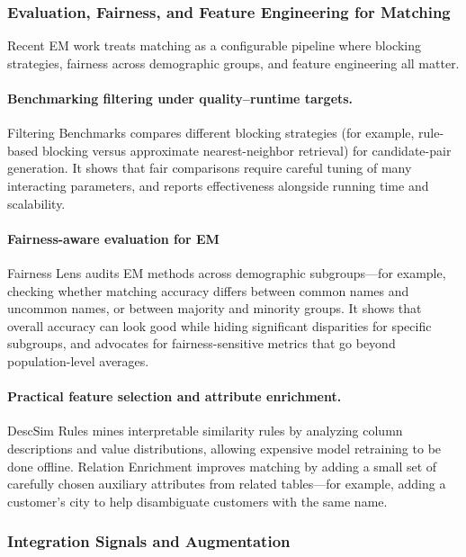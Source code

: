 \documentclass[sigconf]{acmart}
\begin{document}
\subsubsection{Evaluation, Fairness, and Feature Engineering for Matching}

Recent EM work treats matching as a configurable pipeline where blocking strategies, fairness across demographic groups, and feature engineering all matter.

\paragraph{Benchmarking filtering under quality--runtime targets.}
Filtering Benchmarks compares different blocking strategies (for example, rule-based blocking versus approximate nearest-neighbor retrieval) for candidate-pair generation. It shows that fair comparisons require careful tuning of many interacting parameters, and reports effectiveness alongside running time and scalability.

\paragraph{Fairness-aware evaluation for EM}
Fairness Lens audits EM methods across demographic subgroups---for example, checking whether matching accuracy differs between common names and uncommon names, or between majority and minority groups. It shows that overall accuracy can look good while hiding significant disparities for specific subgroups, and advocates for fairness-sensitive metrics that go beyond population-level averages.

\paragraph{Practical feature selection and attribute enrichment.}
DescSim Rules mines interpretable similarity rules by analyzing column descriptions and value distributions, allowing expensive model retraining to be done offline. Relation Enrichment improves matching by adding a small set of carefully chosen auxiliary attributes from related tables---for example, adding a customer's city to help disambiguate customers with the same name.


\subsubsection{Integration Signals and Augmentation}
\label{sec:integration-signals}
\end{document}
